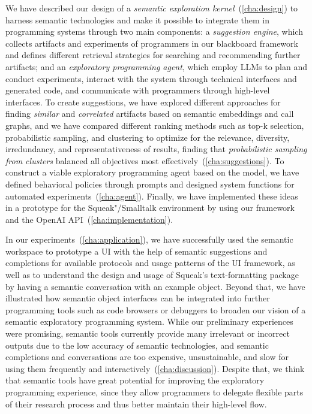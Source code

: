 We have described our design of a \emph{semantic exploration kernel}~(\cref{cha:design}) to harness semantic technologies and make it possible to integrate them in programming systems through two main components:
a \emph{suggestion engine}, which collects artifacts and experiments of programmers in our blackboard framework and defines different retrieval strategies for searching and recommending further artifacts;
and an \emph{exploratory programming agent}, which employ LLMs to plan and conduct experiments, interact with the system through technical interfaces and generated code, and communicate with programmers through high-level interfaces.
To create suggestions, we have explored different approaches for finding \emph{similar} and \emph{correlated} artifacts based on semantic embeddings and call graphs, and we have compared different ranking methods such as top-k selection, probabilistic sampling, and clustering to optimize for the relevance, diversity, irredundancy, and representativeness of results, finding that \emph{probabilistic sampling from clusters} balanced all objectives most effectively~(\cref{cha:suggestions}).
To construct a viable exploratory programming agent based on the \gptfouro model, we have defined behavioral policies through prompts and designed system functions for automated experiments~(\cref{cha:agent}).
Finally, we have implemented these ideas in a prototype for the Squeak"/Smalltalk environment by using our \semtex framework and the OpenAI API~(\cref{cha:implementation}).

In our experiments~(\cref{cha:application}), we have successfully used the semantic workspace to prototype a UI with the help of semantic suggestions and completions for available protocols and usage patterns of the UI framework, as well as to understand the design and usage of Squeak's text-formatting package by having a semantic conversation with an example object.
Beyond that, we have illustrated how semantic object interfaces can be integrated into further programming tools such as code browsers or debuggers to broaden our vision of a semantic exploratory programming system.
While our preliminary experiences were promising, semantic tools currently provide many irrelevant or incorrect outputs due to the low accuracy of semantic technologies, and semantic completions and conversations are too expensive, unsustainable, and slow for using them frequently and interactively~(\cref{cha:discussion}).
Despite that, we think that semantic tools have great potential for improving the exploratory programming experience, since they allow programmers to delegate flexible parts of their research process and thus better maintain their high-level flow.

